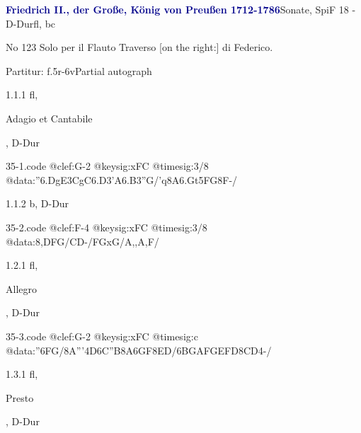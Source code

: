 \documentclass[a4paper, twocolumn, 11pt]{book}
\begin{document}
\par \vspace{16pt} \textcolor{darkblue}{\textbf{Friedrich II., der Große, König von Preußen  1712-1786}}\hfillplus{[35]}\newline Sonate, SpiF 18 - D-Dur\newline fl, bc
\par \begin{itshape} No 123 Solo per il Flauto Traverso [on the right:] di Federico.\end{itshape} 
\par \textcolor{darkblue}{}  Partitur: f.5r-6v\newline Partial autograph
\par 1.1.1  fl, \begin{itshape}Adagio et Cantabile\end{itshape}, D-Dur  
\begin{filecontents*}{35-1.code}
@clef:G-2
@keysig:xFC
@timesig:3/8
@data:''{6.DgE3CgC6.D3'A}{6.B3''G}/'q8A{6.Gt5FG8F}-/
\end{filecontents*}
\newline %
\par 1.1.2  b, D-Dur  
\begin{filecontents*}{35-2.code}
@clef:F-4
@keysig:xFC
@timesig:3/8
@data:8{,DFG}/{CD}-/{FGxG}/{A,,A,F}/
\end{filecontents*}
\newline %
\par 1.2.1  fl, \begin{itshape}Allegro\end{itshape}, D-Dur  
\begin{filecontents*}{35-3.code}
@clef:G-2
@keysig:xFC
@timesig:c
@data:''{6FG}/8A'''4D6{C''B}{8A6GF}{8ED}/{6BGAF}{GEFD}{8CD}4-/
\end{filecontents*}
\newline %
\par 1.3.1  fl, \begin{itshape}Presto\end{itshape}, D-Dur  
\end{document}
